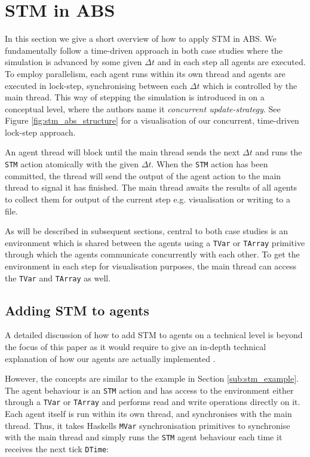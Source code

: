 \section{STM in ABS}
\label{sec:stm_abs}
In this section we give a short overview of how to apply STM in ABS. We fundamentally follow a time-driven approach in both case studies where the simulation is advanced by some given $\Delta t$ and in each step all agents are executed. To employ parallelism, each agent runs within its own thread and agents are executed in lock-step, synchronising between each $\Delta t$ which is controlled by the main thread. This way of stepping the simulation is introduced in \cite{thaler_art_2017} on a conceptual level, where the authors name it \textit{concurrent update-strategy}. See Figure \ref{fig:stm_abs_structure} for a visualisation of our concurrent, time-driven lock-step approach. 

An agent thread will block until the main thread sends the next $\Delta t$ and runs the \texttt{STM} action atomically with the given $\Delta t$. When the \texttt{STM} action has been committed, the thread will send the output of the agent action to the main thread to signal it has finished. The main thread awaits the results of all agents to collect them for output of the current step e.g. visualisation or writing to a file.

As will be described in subsequent sections, central to both case studies is an environment which is shared between the agents using a \texttt{TVar} or \texttt{TArray} primitive through which the agents communicate concurrently with each other. To get the environment in each step for visualisation purposes, the main thread can access the \texttt{TVar} and \texttt{TArray} as well. 

\subsection{Adding STM to agents}
A detailed discussion of how to add STM to agents on a technical level is beyond the focus of this paper as it would require to give an in-depth technical explanation of how our agents are actually implemented \cite{thaler_pure_2018}.

However, the concepts are similar to the example in Section \ref{sub:stm_example}. The agent behaviour is an \texttt{STM} action and has access to the environment either through a \texttt{TVar} or \texttt{TArray} and performs read and write operations directly on it. Each agent itself is run within its own thread, and synchronises with the main thread. Thus, it takes Haskells \texttt{MVar} synchronisation primitives to synchronise with the main thread and simply runs the \texttt{STM} agent behaviour each time it receives the next tick \texttt{DTime}: \\ %

